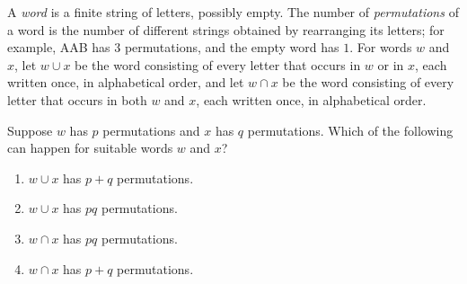 A \emph{word} is a finite string of letters, possibly empty. The number of \emph{permutations} of a word is the number of different strings obtained by rearranging its letters; for example, AAB has $3$ permutations, and the empty word has $1$. For words $w$ and $x$, let $w\cup x$ be the word consisting of every letter that occurs in $w$ or in $x$, each written once, in alphabetical order, and let $w\cap x$ be the word consisting of every letter that occurs in both $w$ and $x$, each written once, in alphabetical order.

Suppose $w$ has $p$ permutations and $x$ has $q$ permutations. Which of the following can happen for suitable words $w$ and $x$?
\begin{enumerate}
\item[(A)] $w\cup x$ has $p+q$ permutations.
\item[(B)] $w\cup x$ has $pq$ permutations.
\item[(C)] $w\cap x$ has $pq$ permutations.
\item[(D)] $w\cap x$ has $p+q$ permutations.
\end{enumerate}
